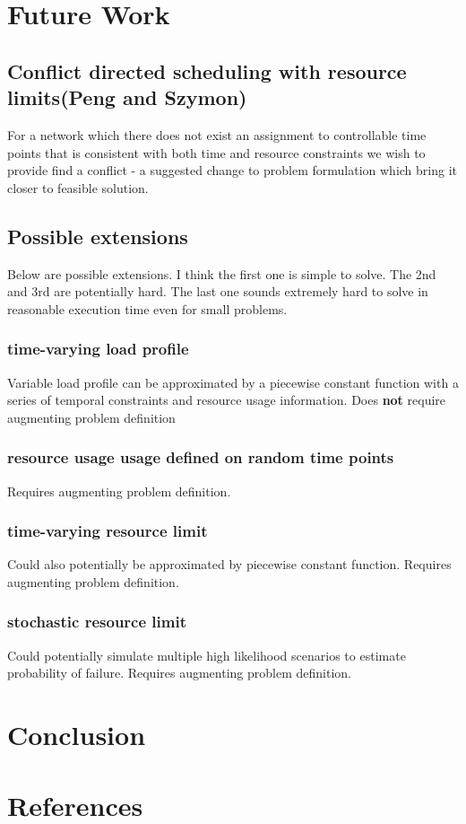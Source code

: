 \documentclass{article}
\begin{document}
\begin{multicols}{2}
\section{Future Work}
\subsection{Conflict directed scheduling with resource limits(Peng and Szymon)}
For a network which there does not exist an assignment to controllable time points that is consistent with both time and resource constraints we wish to provide find a conflict - a suggested change to problem formulation which bring it closer to feasible solution.
\subsection{Possible extensions}
Below are possible extensions. I think the first one is simple to solve. The 2nd and 3rd are potentially hard. The last one sounds extremely hard to solve in reasonable execution time even for small problems.
\subsubsection{time-varying load profile}
Variable load profile can be approximated by a piecewise constant function with a series of temporal constraints and resource usage information. Does \textbf{not} require augmenting problem definition
\subsubsection{resource usage usage defined on random time points}
Requires augmenting problem definition.
\subsubsection{time-varying resource limit}
Could also potentially be approximated by piecewise constant function. Requires augmenting problem definition.
\subsubsection{stochastic resource limit}
Could potentially simulate multiple high likelihood scenarios to estimate probability of failure. Requires augmenting problem definition.%
\section{Conclusion}
\blindtext[5]
\section{References}


\end{multicols}
\end{document}
